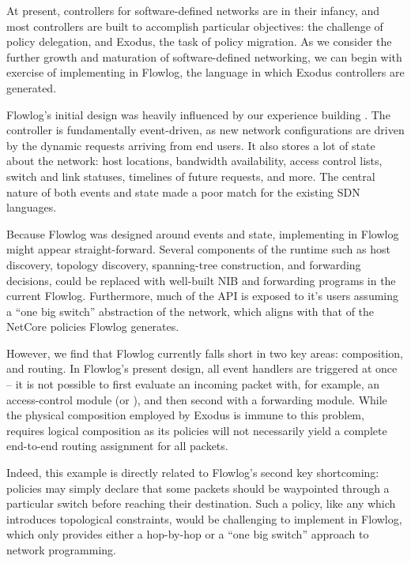 At present, controllers for software-defined networks are in their infancy, and
most controllers are built to accomplish particular objectives: \sys the challenge of policy
delegation, and Exodus, the task of policy migration. As we consider the further
growth and maturation of software-defined networking, we can begin with exercise
of implementing \sys in Flowlog, the language in which Exodus controllers are generated.

Flowlog's initial design was heavily influenced by our experience building \sys.
The \sys controller is fundamentally event-driven, as new network configurations
are driven by the dynamic requests arriving from end users. It also stores a lot of state
about the network: host locations, bandwidth availability, access control lists, switch
and link statuses, timelines of future requests, and more. The central nature of both events
and state made \sys a poor match for the existing SDN languages.

Because Flowlog was designed around events and state, implementing \sys in Flowlog
might appear straight-forward. Several components of the \sys runtime such as host
discovery, topology discovery, spanning-tree construction, and forwarding decisions,
could be replaced with well-built NIB and forwarding programs in the current Flowlog.
Furthermore, much of the \sys API is exposed to it's users assuming a ``one big switch''
abstraction of the network, which aligns with that of the NetCore policies Flowlog generates.

However, we find that Flowlog currently falls short in two key areas: composition, and routing.
In Flowlog's present design, all event handlers are triggered at once -- it is not possible to
first evaluate an incoming packet with, for example, an access-control module (or \sys), and
then second with a forwarding module. While the physical composition employed by Exodus
is immune to this problem, \sys requires logical composition as its policies will not necessarily
yield a complete end-to-end routing assignment for all packets.

Indeed, this example is directly related to Flowlog's second key shortcoming: \sys policies may
simply declare that some packets should be waypointed through a particular switch before
reaching their destination. Such a policy, like any which introduces topological constraints,
would be challenging to implement in Flowlog, which only provides either a hop-by-hop or
a ``one big switch'' approach to network programming.

